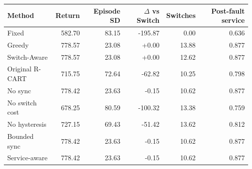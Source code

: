 \begin{tabular}{lrrrrr}\toprule
Method & Return & Episode SD & $\Delta$ vs Switch & Switches & Post-fault service \\
\midrule
Fixed & 582.70 & 83.15 & -195.87 & 0.00 & 0.636 \\
Greedy & 778.57 & 23.08 & +0.00 & 13.88 & 0.877 \\
Switch-Aware & 778.57 & 23.08 & +0.00 & 12.62 & 0.877 \\
Original R-CART & 715.75 & 72.64 & -62.82 & 10.25 & 0.798 \\
No sync & 778.42 & 23.63 & -0.15 & 10.62 & 0.877 \\
No switch cost & 678.25 & 80.59 & -100.32 & 13.38 & 0.759 \\
No hysteresis & 727.15 & 69.43 & -51.42 & 13.62 & 0.812 \\
Bounded sync & 778.42 & 23.63 & -0.15 & 10.62 & 0.877 \\
Service-aware & 778.42 & 23.63 & -0.15 & 10.62 & 0.877 \\
\bottomrule\end{tabular}
